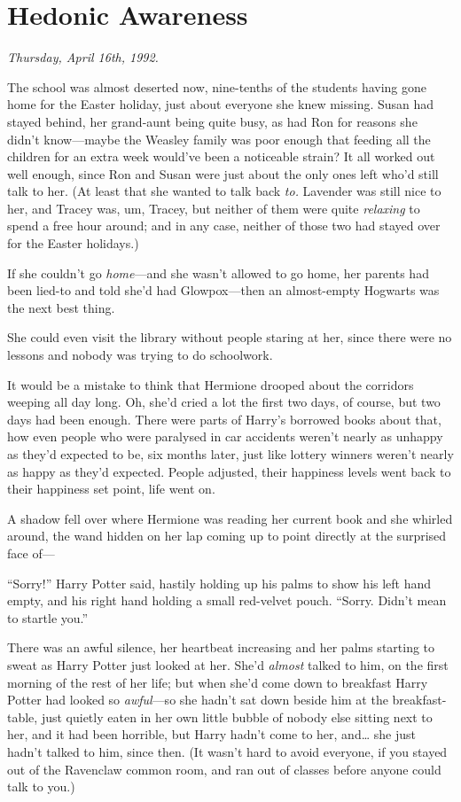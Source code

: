\chapter{Hedonic Awareness}

\emph{Thursday, April 16th, 1992.}

The school was almost deserted now, nine-tenths of the students having
gone home for the Easter holiday, just about everyone she knew missing.
Susan had stayed behind, her grand-aunt being quite busy, as had Ron for
reasons she didn't know---maybe the Weasley family was poor enough that
feeding all the children for an extra week would've been a noticeable
strain? It all worked out well enough, since Ron and Susan were just
about the only ones left who'd still talk to her. (At least that she
wanted to talk back \emph{to.} Lavender was still nice to her, and
Tracey was, um, Tracey, but neither of them were quite \emph{relaxing}
to spend a free hour around; and in any case, neither of those two had
stayed over for the Easter holidays.)

If she couldn't go \emph{home}---and she wasn't allowed to go home, her
parents had been lied-to and told she'd had Glowpox---then an
almost-empty Hogwarts was the next best thing.

She could even visit the library without people staring at her, since
there were no lessons and nobody was trying to do schoolwork.

It would be a mistake to think that Hermione drooped about the corridors
weeping all day long. Oh, she'd cried a lot the first two days, of
course, but two days had been enough. There were parts of Harry's
borrowed books about that, how even people who were paralysed in car
accidents weren't nearly as unhappy as they'd expected to be, six months
later, just like lottery winners weren't nearly as happy as they'd
expected. People adjusted, their happiness levels went back to their
happiness set point, life went on.

A shadow fell over where Hermione was reading her current book and she
whirled around, the wand hidden on her lap coming up to point directly
at the surprised face of---

``Sorry!'' Harry Potter said, hastily holding up his palms to show his
left hand empty, and his right hand holding a small red-velvet pouch.
``Sorry. Didn't mean to startle you.''

There was an awful silence, her heartbeat increasing and her palms
starting to sweat as Harry Potter just looked at her. She'd
\emph{almost} talked to him, on the first morning of the rest of her
life; but when she'd come down to breakfast Harry Potter had looked so
\emph{awful}---so she hadn't sat down beside him at the breakfast-table,
just quietly eaten in her own little bubble of nobody else sitting next
to her, and it had been horrible, but Harry hadn't come to her,
and\ldots{} she just hadn't talked to him, since then. (It wasn't hard
to avoid everyone, if you stayed out of the Ravenclaw common room, and
ran out of classes before anyone could talk to you.)

